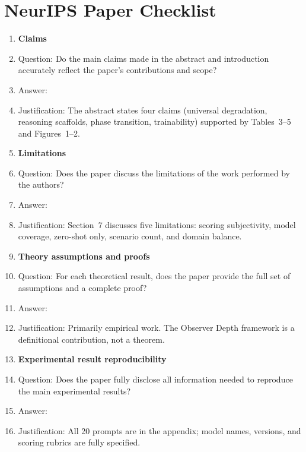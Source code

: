 \documentclass{article}
\begin{document}
\section*{NeurIPS Paper Checklist}

\begin{enumerate}

\item {\bf Claims}
    \item[] Question: Do the main claims made in the abstract and introduction accurately reflect the paper's contributions and scope?
    \item[] Answer: \answerYes{}
    \item[] Justification: The abstract states four claims (universal degradation, reasoning scaffolds, phase transition, trainability) supported by Tables~3--5 and Figures~1--2.

\item {\bf Limitations}
    \item[] Question: Does the paper discuss the limitations of the work performed by the authors?
    \item[] Answer: \answerYes{}
    \item[] Justification: Section~7 discusses five limitations: scoring subjectivity, model coverage, zero-shot only, scenario count, and domain balance.

\item {\bf Theory assumptions and proofs}
    \item[] Question: For each theoretical result, does the paper provide the full set of assumptions and a complete proof?
    \item[] Answer: \answerNA{}
    \item[] Justification: Primarily empirical work. The Observer Depth framework is a definitional contribution, not a theorem.

\item {\bf Experimental result reproducibility}
    \item[] Question: Does the paper fully disclose all information needed to reproduce the main experimental results?
    \item[] Answer: \answerYes{}
    \item[] Justification: All 20 prompts are in the appendix; model names, versions, and scoring rubrics are fully specified.


\end{enumerate}
\end{document}
